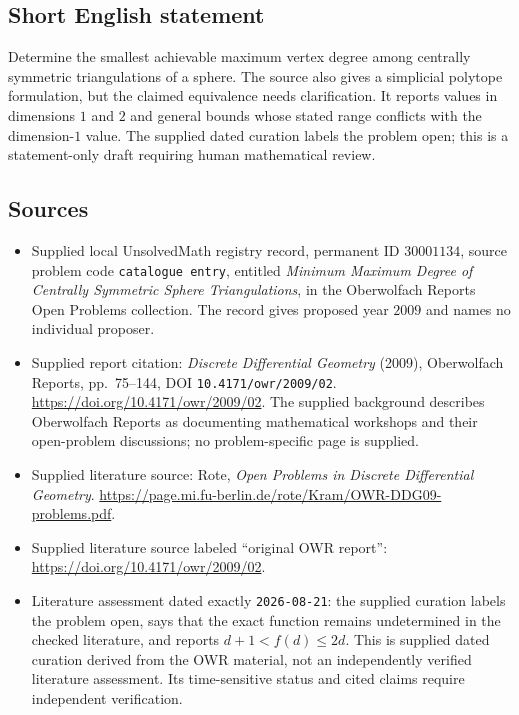 \documentclass[11pt]{article}
\begin{document}
\subsection{Short English statement}
Determine the smallest achievable maximum vertex degree among centrally symmetric triangulations of a sphere. The source also gives a simplicial polytope formulation, but the claimed equivalence needs clarification. It reports values in dimensions \(1\) and \(2\) and general bounds whose stated range conflicts with the dimension-\(1\) value. The supplied dated curation labels the problem open; this is a statement-only draft requiring human mathematical review.
\subsection{Sources}
\begin{itemize}
\item Supplied local UnsolvedMath registry record, permanent ID \(30001134\), source problem code \texttt{catalogue entry}, entitled \emph{Minimum Maximum Degree of Centrally Symmetric Sphere Triangulations}, in the Oberwolfach Reports Open Problems collection. The record gives proposed year \(2009\) and names no individual proposer.
\item Supplied report citation: \emph{Discrete Differential Geometry} (2009), Oberwolfach Reports, pp.~75--144, DOI \texttt{10.4171/owr/2009/02}. \url{https://doi.org/10.4171/owr/2009/02}. The supplied background describes Oberwolfach Reports as documenting mathematical workshops and their open-problem discussions; no problem-specific page is supplied.
\item Supplied literature source: Rote, \emph{Open Problems in Discrete Differential Geometry}. \url{https://page.mi.fu-berlin.de/rote/Kram/OWR-DDG09-problems.pdf}.
\item Supplied literature source labeled ``original OWR report'': \url{https://doi.org/10.4171/owr/2009/02}.
\item Literature assessment dated exactly \texttt{2026-08-21}: the supplied curation labels the problem open, says that the exact function remains undetermined in the checked literature, and reports \(d+1<f(d)\leq2d\). This is supplied dated curation derived from the OWR material, not an independently verified literature assessment. Its time-sensitive status and cited claims require independent verification.
\end{itemize}
\end{document}
